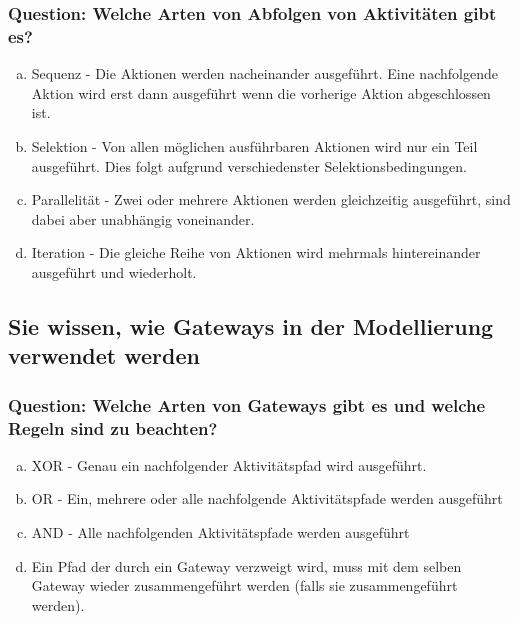 \documentclass{article}
\begin{document}
\begin{adjustwidth}{2em}{2em}
\begin{adjustwidth}{2em}{2em}
\begin{adjustwidth}{1em}{}
				\subsubsection*{Question: Welche Arten von Abfolgen von Aktivitäten gibt es?}
				\begin{adjustwidth}{1em}{}
					\begin{enumerate}[(a)]
						\item Sequenz - Die Aktionen werden nacheinander ausgeführt. Eine nachfolgende Aktion wird erst dann ausgeführt wenn die vorherige Aktion abgeschlossen ist.
						\item Selektion -  Von allen möglichen ausführbaren Aktionen wird nur ein Teil ausgeführt. Dies folgt aufgrund verschiedenster Selektionsbedingungen.
						\item Parallelität - Zwei oder mehrere Aktionen werden gleichzeitig ausgeführt, sind dabei aber unabhängig voneinander.
						\item Iteration - Die gleiche Reihe von Aktionen wird mehrmals hintereinander ausgeführt und wiederholt.
					\end{enumerate}
				\end{adjustwidth}
			\end{adjustwidth}
			\subsection{Sie wissen, wie Gateways in der Modellierung verwendet werden}
			\begin{adjustwidth}{1em}{}
				\subsubsection*{Question: Welche Arten von Gateways gibt es und welche Regeln sind zu beachten?}
				\begin{adjustwidth}{1em}{}
					\begin{enumerate}[(a)]
						\item XOR - Genau ein nachfolgender Aktivitätspfad wird ausgeführt.
						\item OR - Ein, mehrere oder alle nachfolgende Aktivitätspfade werden ausgeführt
						\item AND - Alle nachfolgenden Aktivitätspfade werden ausgeführt
						\item Ein Pfad der durch ein Gateway verzweigt wird, muss mit dem selben Gateway wieder zusammengeführt werden (falls sie zusammengeführt werden).
					\end{enumerate}
				\end{adjustwidth}
			\end{adjustwidth}

\end{adjustwidth}
\end{adjustwidth}
\end{document}
